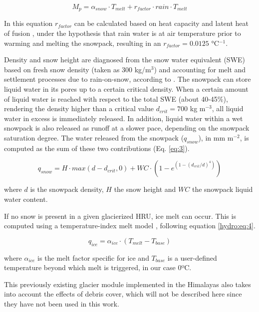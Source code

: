 \begin{equation} \label{hydro:eq:2}
 M_{p} = \alpha_{snow} \cdot T_{melt} + r_{factor} \cdot rain \cdot T_{melt} 
\end{equation} 

In this equation $r_{factor}$ can be calculated based on heat capacity and latent heat of fusion , under the hypothesis that rain water is at air temperature prior to warming and melting the snowpack, resulting in an $r_{factor}=0.0125$ °C$^{-1}$. 

Density and snow height are diagnosed from the snow water equivalent (SWE) based on fresh snow density (taken as 300 kg/m$^{3}$) and accounting for melt and settlement processes due to rain-on-snow, according to \citet{bertle_effect_1966}. The snowpack can store liquid water in its pores up to a certain critical density. When a certain amount of liquid water is reached with respect to the total SWE (about 40-45\%), rendering the density higher than a critical value $d_{crit}=700$ kg m$^{-3}$, all liquid water in excess is immediately released. In addition, liquid water within a wet snowpack is also released as runoff at a slower pace, depending on the snowpack saturation degree. The water released from the snowpack ($q_{snow}$), in mm m$^{-2}$, is computed as the sum of these two contributions  (Eq. \ref{eq:3}).

\begin{equation} \label{hydro:eq:3}
q_{snow} = H \cdot max(d - d_{crit}, 0) + WC \cdot (1-e^{(1-(d_{crit}/d)^4)})
\end{equation} 

where $d$ is the snowpack density, $H$ the snow height and $WC$ the snowpack liquid water content. 

If no snow is present in a given glacierized HRU, ice melt can occur. This is computed using a temperature-index melt model \citep{hock_temperature_2003}, following equation \ref{hydro:eq:4}.

\begin{equation} \label{hydro:eq:4}
q_{ice} = \alpha_{ice } \cdot(T_{melt} - T_{base})
\end{equation} 

where $\alpha_{ice}$ is the melt factor specific for ice and $T_{base}$ is a user-defined temperature beyond which melt is triggered, in our case 0ºC. 

This previously existing glacier module implemented in the Himalayas also takes into account the effects of debris cover, which will not be described here since they have not been used in this work. 

